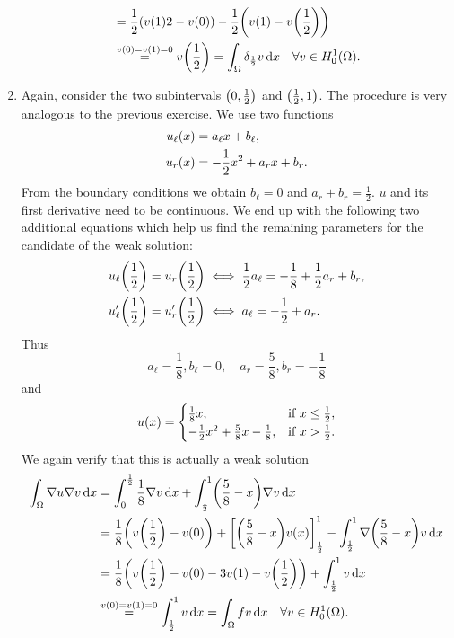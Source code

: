 \documentclass[english]{exercise}
\begin{document}
\begin{enumerate}
\begin{align*}
			&= \frac{1}{2}\parentheses*{v\parentheses*{1}{2} - v\parentheses*{0}} - \frac{1}{2}\parentheses*{v\parentheses*{1} - v\parentheses*{\frac{1}{2}}}\\
			&\stackrel{v\parentheses*{0} = v\parentheses*{1} = 0}{=} v\parentheses*{\frac{1}{2}} = \int_\Omega \delta_{\frac{1}{2}}v\d x \quad \forall v \in H_0^1\parentheses*{\Omega}.
		\end{align*}
		\item Again, consider the two subintervals \(\parentheses*{0, \frac{1}{2}}\) and \(\parentheses*{\frac{1}{2}, 1}\).
		The procedure is very analogous to the previous exercise. We use two functions
		\begin{align*}
			u_\ell\parentheses*{x} &= a_\ell x + b_\ell,\\
			u_r\parentheses*{x} &= -\frac{1}{2}x^2 + a_r x + b_r.
		\end{align*}
		From the boundary conditions we obtain \(b_\ell = 0\) and \(a_r + b_r = \frac{1}{2}\).
		\(u\) and its first derivative need to be continuous.
		We end up with the following two additional equations which help us find the remaining parameters for the candidate of the weak solution:
		\begin{align*}
			u_\ell\parentheses*{\frac{1}{2}} = u_r\parentheses*{\frac{1}{2}} &\iff \frac{1}{2}a_\ell = -\frac{1}{8} + \frac{1}{2}a_r + b_r,\\
			u_\ell'\parentheses*{\frac{1}{2}} = u_r'\parentheses*{\frac{1}{2}} &\iff a_\ell = -\frac{1}{2} + a_r.
		\end{align*}
		Thus
		\[
			a_\ell = \frac{1}{8}, b_\ell = 0, \quad a_r = \frac{5}{8}, b_r = -\frac{1}{8}
		\]
		and
		\[
			u\parentheses*{x} = \begin{cases}
				\frac{1}{8}x, & \text{if }x \le \frac{1}{2},\\
				-\frac{1}{2}x^2 + \frac{5}{8}x - \frac{1}{8}, & \text{if }x > \frac{1}{2}.
			\end{cases}
		\]
		We again verify that this is actually a weak solution
		\begin{align*}
			\int_\Omega \nabla u\nabla v\d x &= \int_0^{\frac{1}{2}}\frac{1}{8}\nabla v\d x + \int_{\frac{1}{2}}^1 \parentheses*{\frac{5}{8} - x}\nabla v\d x\\
			&= \frac{1}{8}\parentheses*{v\parentheses*{\frac{1}{2}} - v\parentheses*{0}} + \brackets*{\parentheses*{\frac{5}{8} - x}v\parentheses*{x}}_{\frac{1}{2}}^1 - \int_{\frac{1}{2}}^1 \nabla\parentheses*{\frac{5}{8} - x}v\d x\\
			&= \frac{1}{8}\parentheses*{v\parentheses*{\frac{1}{2}} - v\parentheses*{0} - 3v\parentheses*{1} - v\parentheses*{\frac{1}{2}}} + \int_{\frac{1}{2}}^1 v\d x\\
			&\stackrel{v\parentheses*{0} = v\parentheses*{1} = 0}{=} \int_{\frac{1}{2}}^1 v\d x = \int_\Omega fv\d x \quad \forall v \in H_0^1\parentheses*{\Omega}.
		\end{align*}
	\end{enumerate}
\end{document}
